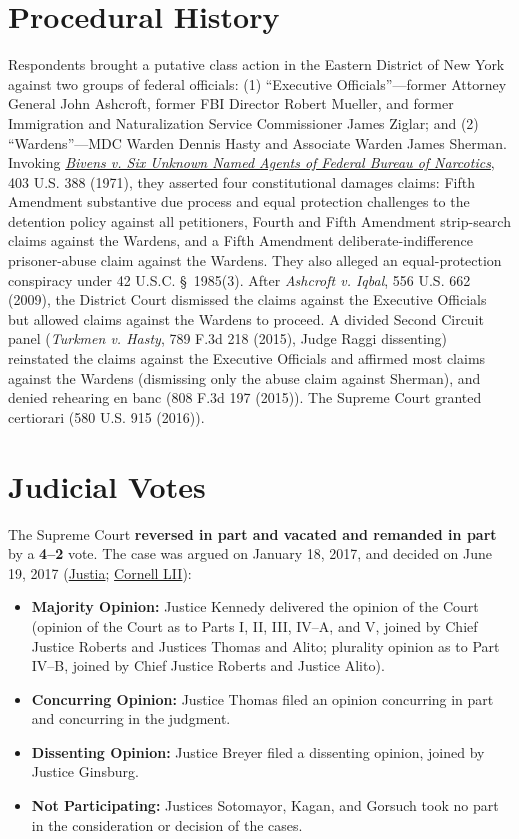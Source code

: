 \documentclass[12pt]{article}
\begin{document}
\section{Procedural History}
Respondents brought a putative class action in the Eastern District of New York against two groups of federal officials: (1) ``Executive Officials''---former Attorney General John Ashcroft, former FBI Director Robert Mueller, and former Immigration and Naturalization Service Commissioner James Ziglar; and (2) ``Wardens''---MDC Warden Dennis Hasty and Associate Warden James Sherman. Invoking \href{https://supreme.justia.com/cases/federal/us/403/388/}{\textit{Bivens v. Six Unknown Named Agents of Federal Bureau of Narcotics}}, 403 U.S. 388 (1971), they asserted four constitutional damages claims: Fifth Amendment substantive due process and equal protection challenges to the detention policy against all petitioners, Fourth and Fifth Amendment strip-search claims against the Wardens, and a Fifth Amendment deliberate-indifference prisoner-abuse claim against the Wardens. They also alleged an equal-protection conspiracy under 42 U.S.C. \S~1985(3). After \textit{Ashcroft v. Iqbal}, 556 U.S. 662 (2009), the District Court dismissed the claims against the Executive Officials but allowed claims against the Wardens to proceed. A divided Second Circuit panel (\textit{Turkmen v. Hasty}, 789 F.3d 218 (2015), Judge Raggi dissenting) reinstated the claims against the Executive Officials and affirmed most claims against the Wardens (dismissing only the abuse claim against Sherman), and denied rehearing en banc (808 F.3d 197 (2015)). The Supreme Court granted certiorari (580 U.S. 915 (2016)).

\section{Judicial Votes}
The Supreme Court \textbf{reversed in part and vacated and remanded in part} by a \textbf{4--2} vote. The case was argued on January 18, 2017, and decided on June 19, 2017 (\href{https://supreme.justia.com/cases/federal/us/582/15-1358/}{Justia}; \href{https://www.law.cornell.edu/supremecourt/text/15-1358}{Cornell LII}):

\begin{itemize}

\item \textbf{Majority Opinion:} Justice Kennedy delivered the opinion of the Court (opinion of the Court as to Parts I, II, III, IV--A, and V, joined by Chief Justice Roberts and Justices Thomas and Alito; plurality opinion as to Part IV--B, joined by Chief Justice Roberts and Justice Alito).

\item \textbf{Concurring Opinion:} Justice Thomas filed an opinion concurring in part and concurring in the judgment.
    \item \textbf{Dissenting Opinion:} Justice Breyer filed a dissenting opinion, joined by Justice Ginsburg.
    \item \textbf{Not Participating:} Justices Sotomayor, Kagan, and Gorsuch took no part in the consideration or decision of the cases.

\end{itemize}
\end{document}
